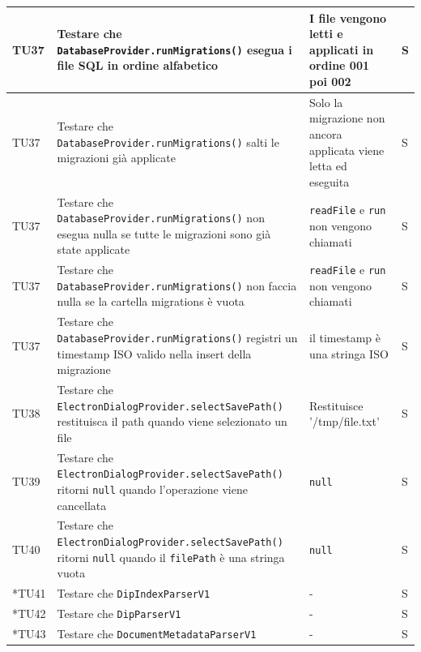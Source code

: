 \documentclass[a4paper,12pt]{article}
\begin{document}
\begin{longtable}{|M{1.2cm}|M{5cm}|M{7cm}|M{1.5cm}|}
            TU37 & Testare che \texttt{DatabaseProvider.runMigrations()} esegua i file SQL in ordine alfabetico & I file vengono letti e applicati in ordine 001 poi 002 & S \\
            \hline

            TU37 & Testare che \texttt{DatabaseProvider.runMigrations()} salti le migrazioni già applicate & Solo la migrazione non ancora applicata viene letta ed eseguita & S \\
            \hline

            TU37 & Testare che \texttt{DatabaseProvider.runMigrations()} non esegua nulla se tutte le migrazioni sono già state applicate & \texttt{readFile} e \texttt{run} non vengono chiamati & S \\
            \hline

            TU37 & Testare che \texttt{DatabaseProvider.runMigrations()} non faccia nulla se la cartella migrations è vuota & \texttt{readFile} e \texttt{run} non vengono chiamati & S \\
            \hline

            TU37 & Testare che \texttt{DatabaseProvider.runMigrations()} registri un timestamp ISO valido nella insert della migrazione & il timestamp è una stringa ISO & S \\
            \hline

            TU38 & Testare che \texttt{ElectronDialogProvider.selectSavePath()} restituisca il path quando viene selezionato un file & Restituisce '/tmp/file.txt' & S \\
            \hline

            TU39 & Testare che \texttt{ElectronDialogProvider.selectSavePath()} ritorni \texttt{null} quando l'operazione viene cancellata & \texttt{null} & S \\
            \hline

            TU40 & Testare che \texttt{ElectronDialogProvider.selectSavePath()} ritorni \texttt{null} quando il \texttt{filePath} è una stringa vuota & \texttt{null} & S \\
            \hline

            *TU41 & Testare che \texttt{DipIndexParserV1} & - & S \\
            \hline

            *TU42 & Testare che \texttt{DipParserV1} & - & S \\
            \hline

            *TU43 & Testare che \texttt{DocumentMetadataParserV1} & - & S \\
            \hline


\end{longtable}
\end{document}
